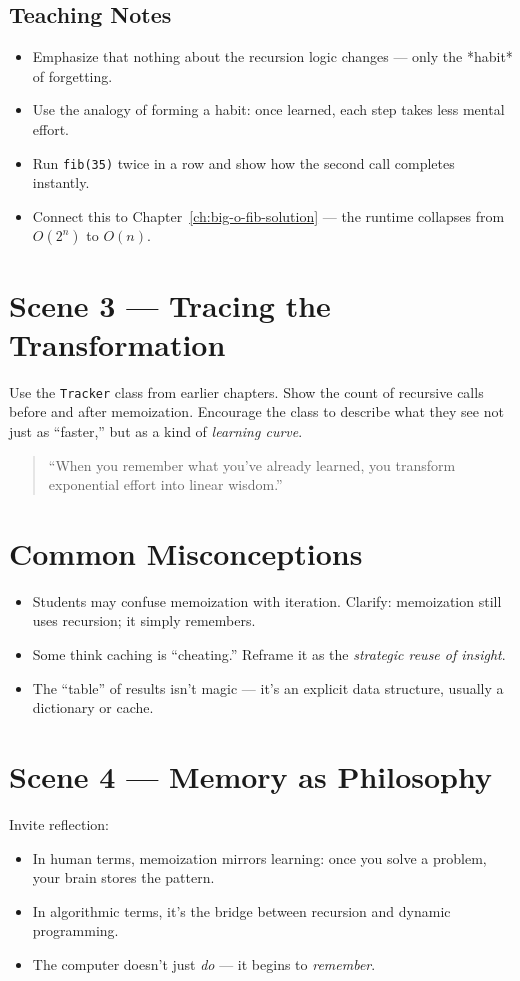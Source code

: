 \subsection*{Teaching Notes}
\begin{itemize}
  \item Emphasize that nothing about the recursion logic changes — only the *habit* of forgetting.
  \item Use the analogy of forming a habit: once learned, each step takes less mental effort.
  \item Run \texttt{fib(35)} twice in a row and show how the second call completes instantly.
  \item Connect this to Chapter~\ref{ch:big-o-fib-solution} — the runtime collapses from $O(2^n)$ to $O(n)$.
\end{itemize}

\section*{Scene 3 --- Tracing the Transformation}
Use the \texttt{Tracker} class from earlier chapters.  
Show the count of recursive calls before and after memoization.  
Encourage the class to describe what they see not just as “faster,” but as a kind of \emph{learning curve}.

\begin{quote}
“When you remember what you’ve already learned, you transform exponential effort into linear wisdom.”
\end{quote}

\section*{Common Misconceptions}
\begin{itemize}
  \item Students may confuse memoization with iteration. Clarify: memoization still uses recursion; it simply remembers.
  \item Some think caching is “cheating.” Reframe it as the \emph{strategic reuse of insight}.
  \item The “table” of results isn’t magic — it’s an explicit data structure, usually a dictionary or cache.
\end{itemize}

\section*{Scene 4 --- Memory as Philosophy}
Invite reflection:
\begin{itemize}
  \item In human terms, memoization mirrors learning: once you solve a problem, your brain stores the pattern.
  \item In algorithmic terms, it’s the bridge between recursion and dynamic programming.
  \item The computer doesn’t just \emph{do} — it begins to \emph{remember}.
\end{itemize}

